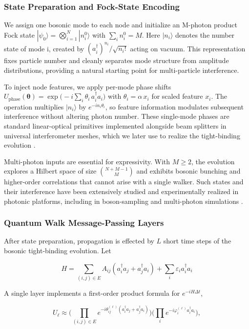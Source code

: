 \documentclass[11pt]{article}
\begin{document}
\subsubsection{State Preparation and Fock-State Encoding}

We assign one bosonic mode to each node and initialize an M-photon product Fock state $|\psi_0\rangle=\bigotimes_{i=1}^N |n_i^0\rangle$ with $\sum_i n_i^0=M$. Here $|n_i\rangle$ denotes the number state of mode i, created by $(a_i^\dagger)^{n_i}/\sqrt{n_i!}$ acting on vacuum. This representation fixes particle number and cleanly separates mode structure from amplitude distributions, providing a natural starting point for multi-particle interference.

To inject node features, we apply per-mode phase shifts $U_{\text{phase}}(\boldsymbol{\theta})=\exp\!\big(-i\sum_i \theta_i\, a_i^\dagger a_i\big)$ with $\theta_i=\alpha\,x_i$ for scaled feature $x_i$. The operation multiplies $|n_i\rangle$ by $e^{-i n_i \theta_i}$, so feature information modulates subsequent interference without altering photon number. These single-mode phases are standard linear-optical primitives implemented alongside beam splitters in universal interferometer meshes, which we later use to realize the tight-binding evolution \citep{campos1989beamsplitter,reck1994universal,clements2016optical}.

Multi-photon inputs are essential for expressivity. With $M\ge2$, the evolution explores a Hilbert space of size $\binom{N+M-1}{M}$ and exhibits bosonic bunching and higher-order correlations that cannot arise with a single walker. Such states and their interference have been extensively studied and experimentally realized in photonic platforms, including in boson-sampling and multi-photon simulations \citep{hong1987hom,aaronson2011bosonsampling}.

\subsubsection{Quantum Walk Message-Passing Layers}

After state preparation, propagation is effected by $L$ short time steps of the bosonic tight-binding evolution. Let

$$
H = \sum_{(i,j)\in E} A_{ij}(a_i^\dagger a_j+a_j^\dagger a_i) + \sum_i \varepsilon_i a_i^\dagger a_i
$$

A single layer implements a first-order product formula for $e^{-iH\Delta t}$,

$$
U_\ell \approx \Bigg(\prod_{(i,j)\in E} e^{-i\theta_{ij}^{(\ell)}(a_i^\dagger a_j+a_j^\dagger a_i)}\Bigg) \Bigg(\prod_{i} e^{-i\varphi_i^{(\ell)} a_i^\dagger a_i}\Bigg),
$$
\end{document}
